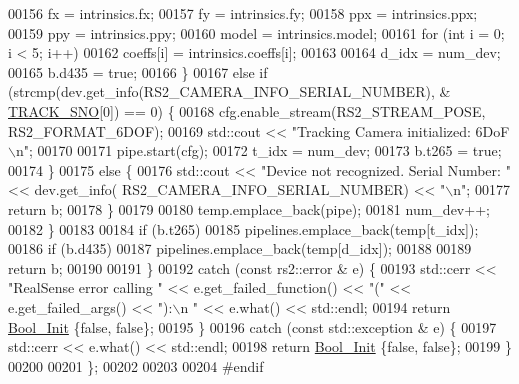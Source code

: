 \begin{DoxyCode}
00156                 fx  = intrinsics.fx;
00157                 fy  = intrinsics.fy;
00158                 ppx = intrinsics.ppx;
00159                 ppy = intrinsics.ppy;
00160                 model = intrinsics.model;
00161                 \textcolor{keywordflow}{for} (\textcolor{keywordtype}{int} i = 0; i < 5; i++)
00162                     coeffs[i] = intrinsics.coeffs[i];
00163 
00164                 d\_idx = num\_dev;
00165                 b.d435 = \textcolor{keyword}{true};
00166             \}
00167             \textcolor{keywordflow}{else} \textcolor{keywordflow}{if} (strcmp(dev.get\_info(RS2\_CAMERA\_INFO\_SERIAL\_NUMBER), &
      \hyperlink{Camera_8hpp_a97168636c8d72f641dc410554a42b2ec}{TRACK\_SNO}[0]) == 0) \{
00168                 cfg.enable\_stream(RS2\_STREAM\_POSE, RS2\_FORMAT\_6DOF);
00169                 std::cout << \textcolor{stringliteral}{"Tracking Camera initialized: 6DoF\(\backslash\)n"};
00170 
00171                 pipe.start(cfg);
00172                 t\_idx = num\_dev;
00173                 b.t265 = \textcolor{keyword}{true};
00174             \}
00175             \textcolor{keywordflow}{else} \{
00176                 std::cout << \textcolor{stringliteral}{"Device not recognized. Serial Number: "} << dev.get\_info(
      RS2\_CAMERA\_INFO\_SERIAL\_NUMBER) << \textcolor{stringliteral}{"\(\backslash\)n"};
00177                 \textcolor{keywordflow}{return} b;
00178             \}
00179 
00180             temp.emplace\_back(pipe);
00181             num\_dev++;
00182         \}
00183 
00184         \textcolor{keywordflow}{if} (b.t265)
00185             pipelines.emplace\_back(temp[t\_idx]);
00186         \textcolor{keywordflow}{if} (b.d435)
00187             pipelines.emplace\_back(temp[d\_idx]);
00188 
00189         \textcolor{keywordflow}{return} b;
00190 
00191     \}
00192     \textcolor{keywordflow}{catch} (\textcolor{keyword}{const} rs2::error & e) \{
00193         std::cerr << \textcolor{stringliteral}{"RealSense error calling "} << e.get\_failed\_function() << \textcolor{stringliteral}{"("} << e.get\_failed\_args() <<
       \textcolor{stringliteral}{"):\(\backslash\)n    "} << e.what() << std::endl;
00194         \textcolor{keywordflow}{return} \hyperlink{structBool__Init}{Bool\_Init} \{\textcolor{keyword}{false}, \textcolor{keyword}{false}\};
00195     \}
00196     \textcolor{keywordflow}{catch} (\textcolor{keyword}{const} std::exception & e) \{
00197         std::cerr << e.what() << std::endl;
00198         \textcolor{keywordflow}{return} \hyperlink{structBool__Init}{Bool\_Init} \{\textcolor{keyword}{false}, \textcolor{keyword}{false}\};
00199     \}
00200 
00201 \};
00202 
00203 
00204 \textcolor{preprocessor}{#endif}
\end{DoxyCode}
